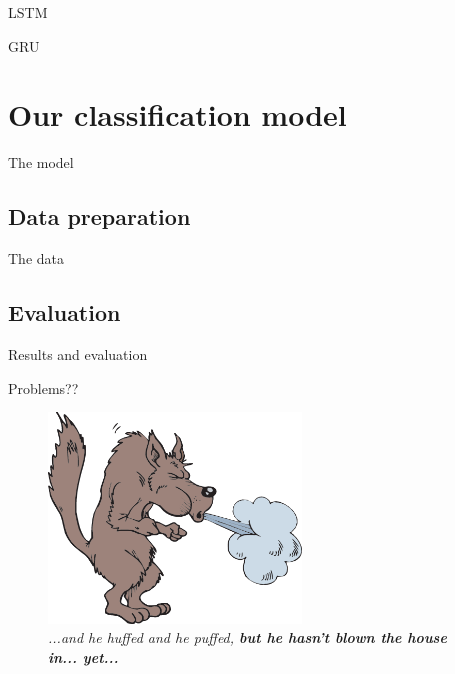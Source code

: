 \documentclass[9pt]{beamer}
\begin{document}
\begin{frame}{LSTM}

\end{frame}

\begin{frame}{GRU}

\end{frame}

\section{Our classification model}

\begin{frame}{The model}

\end{frame}

\subsection{Data preparation}
\begin{frame}{The data}

\end{frame}


\subsection{Evaluation}
\begin{frame}{Results and evaluation}

\end{frame}

\begin{frame}{Problems??}
	\begin{center}
		\begin{figure}
			\includegraphics[width=0.6\textwidth,height=!]{imgs/huffedandpuffed.png}
			\caption{\textit{...and he huffed and he puffed, \textbf{but he hasn't blown the house in... yet...}}}
		\end{figure}
	\end{center}
\end{frame}
\end{document}
